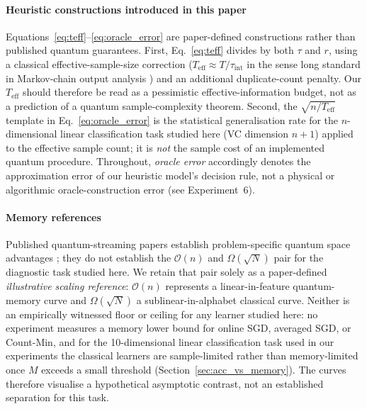 \documentclass[sensors,article,submit,pdftex,moreauthors]{Definitions/mdpi}
\newcommand{\bigO}{\mathcal{O}}
\newcommand{\Teff}{T_{\mathrm{eff}}}
\begin{document}
\paragraph{Heuristic constructions introduced in this paper} Equations~\eqref{eq:teff}--\eqref{eq:oracle_error} are paper-defined constructions rather than published quantum guarantees. First, Eq.~\eqref{eq:teff} divides by both $\tau$ and $r$, using a classical effective-sample-size correction ($\Teff \approx T/\tau_{\mathrm{int}}$ in the sense long standard in Markov-chain output analysis \citep{geyer1992practical}) and an additional duplicate-count penalty. Our $\Teff$ should therefore be read as a pessimistic effective-information budget, not as a prediction of a quantum sample-complexity theorem. Second, the $\sqrt{n/\Teff}$ template in Eq.~\eqref{eq:oracle_error} is the statistical generalisation rate for the $n$-dimensional linear classification task studied here (VC dimension $n{+}1$) applied to the effective sample count; it is \emph{not} the sample cost of an implemented quantum procedure. Throughout, \emph{oracle error} accordingly denotes the approximation error of our heuristic model's decision rule, not a physical or algorithmic oracle-construction error (see Experiment~6).

\paragraph{Memory references} Published quantum-streaming papers establish problem-specific quantum space advantages \citep{kallaugher2021streaming, kallaugher2024maxdicut}; they do not establish the $\bigO(n)$ and $\Omega(\sqrt{N})$ pair for the diagnostic task studied here. We retain that pair solely as a paper-defined \emph{illustrative scaling reference}: $\bigO(n)$ represents a linear-in-feature quantum-memory curve and $\Omega(\sqrt{N})$ a sublinear-in-alphabet classical curve. Neither is an empirically witnessed floor or ceiling for any learner studied here: no experiment measures a memory lower bound for online SGD, averaged SGD, or Count-Min, and for the 10-dimensional linear classification task used in our experiments the classical learners are sample-limited rather than memory-limited once $M$ exceeds a small threshold (Section~\ref{sec:acc_vs_memory}). The curves therefore visualise a hypothetical asymptotic contrast, not an established separation for this task.
\end{document}
